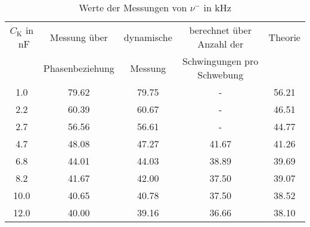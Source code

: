\begin{table}[h!]
\begin{center}
\begin{tabular}{c | c | c | c | c}
	$C_\text{K}$ in \SI{}{\nano\farad} & Messung über & dynamische & berechnet über Anzahl der & Theorie \\
	& Phasenbeziehung & Messung & Schwingungen pro Schwebung & \\
\hline
	1.0 & 79.62 & 79.75 & - & 56.21 \\
	2.2 & 60.39 & 60.67 & - & 46.51 \\
	2.7 & 56.56 & 56.61 & - & 44.77 \\
	4.7 & 48.08 & 47.27 & 41.67 & 41.26 \\
	6.8 & 44.01 & 44.03 & 38.89 & 39.69 \\
	8.2 & 41.67 & 42.00 & 37.50 & 39.07 \\
	10.0 & 40.65 & 40.78 & 37.50 & 38.52 \\
	12.0 & 40.00 & 39.16 & 36.66 & 38.10 \\
\end{tabular}
\end{center}
\caption{Werte der Messungen von $\nu^-$ in \si{\kilo\hertz}}
\label{fig:FreqMinus}
\end{table}
